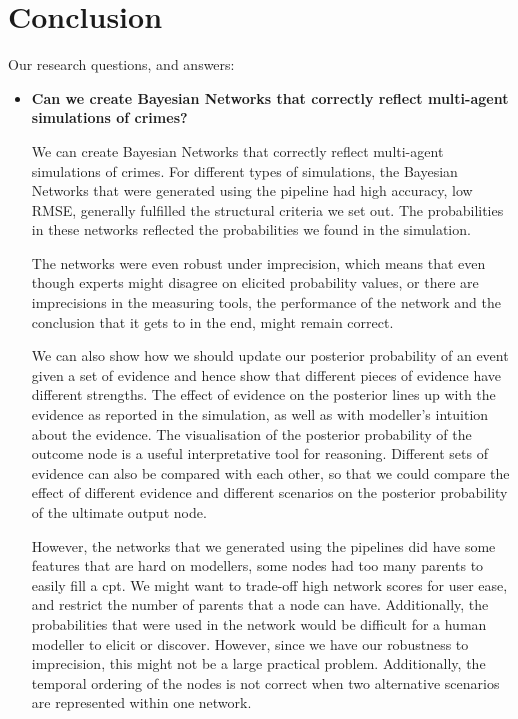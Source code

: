  

\chapter[Conclusion]{Conclusion}


Our research questions, and answers:

\begin{itemize}
\item \textbf{Can we create Bayesian Networks that correctly reflect multi-agent simulations of crimes?}

We can create Bayesian Networks that correctly reflect multi-agent simulations of crimes. For different types of simulations, the Bayesian Networks that were generated using the pipeline had high accuracy, low RMSE, generally fulfilled the structural criteria we set out. The probabilities in these networks reflected the probabilities we found in the simulation. 

The networks were even robust under imprecision, which means that even though experts might disagree on elicited probability values, or there are imprecisions in the measuring tools, the performance of the network and the conclusion that it gets to in the end, might remain correct. 

We can also show how we should update our posterior probability of an event given a set of evidence and hence show that different pieces of evidence have different strengths. The effect of evidence on the posterior lines up with the evidence as reported in the simulation, as well as with modeller's intuition about the evidence. The visualisation of the posterior probability of the outcome node is a useful interpretative tool for reasoning. Different sets of evidence can also be compared with each other, so that we could compare the effect of different evidence and different scenarios on the posterior probability of the ultimate output node.


However, the networks that we generated using the pipelines did have some features that are hard on modellers, some nodes had too many parents to easily fill a cpt. We might want to trade-off high network scores for user ease, and restrict the number of parents that a node can have. Additionally, the probabilities that were used in the network would be difficult for a human modeller to elicit or discover. However, since we have our robustness to imprecision, this might not be a large practical problem. Additionally, the temporal ordering of the nodes is not correct when two alternative scenarios are represented within one network.



\end{itemize}

